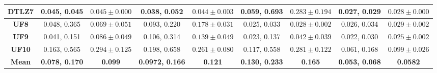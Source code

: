 \begin{table*}[t]
{\begin{tabular}{c|c|c|c|c|c|c|c|c|}
\multicolumn{1}{|c|}{\textbf{DTLZ7}} & 0.045, 0.045            & $0.045 \pm 0.000$       & 0.038, 0.052            & $0.044 \pm 0.003$       & 0.059, 0.693            & $0.283 \pm 0.194$       & 0.027, 0.029            & $0.028 \pm 0.000$       \\ \hline
\multicolumn{1}{|c|}{\textbf{UF8}}   & 0.048, 0.365            & $0.069 \pm 0.051$       & 0.093, 0.220            & $0.178 \pm 0.031$       & 0.025, 0.033            & $0.028 \pm 0.002$       & 0.026, 0.034            & $0.029 \pm 0.002$       \\ \hline
\multicolumn{1}{|c|}{\textbf{UF9}}   & 0.041, 0.151            & $0.086 \pm 0.049$       & 0.106, 0.314            & $0.139 \pm 0.049$       & 0.023, 0.137            & $0.042 \pm 0.039$       & 0.022, 0.030            & $0.025 \pm 0.002$       \\ \hline
\multicolumn{1}{|c|}{\textbf{UF10}}  & 0.163, 0.565            & $0.294 \pm 0.125$       & 0.198, 0.658            & $0.261 \pm 0.080$       & 0.117, 0.558            & $0.281 \pm 0.122$       & 0.061, 0.168            & $0.099 \pm 0.026$       \\ \hline
\multicolumn{1}{|c|}{\textbf{Mean}}  & \textbf{0.078, 0.170}   & \textbf{0.099}          & \textbf{0.0972, 0.166}  & \textbf{0.121}          & \textbf{0.130, 0.233}   & \textbf{0.165}          & \textbf{0.053, 0.068}   & \textbf{0.0582}         \\ \hline
\end{tabular}%
}
\end{table*}


